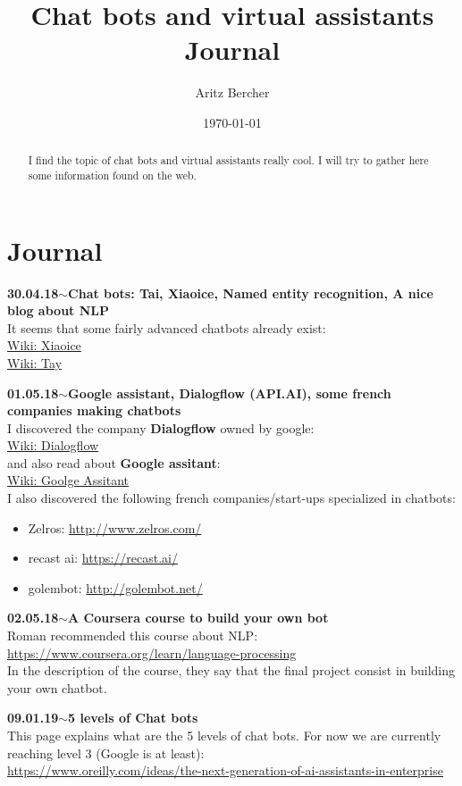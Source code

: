 \documentclass[11pt,a4paper]{article}
\title{Chat bots and virtual assistants\\ Journal}
\author{Aritz Bercher}
\date{\today}
\newenvironment{loggentry}[2]%
{\noindent\textbf{#1}\hspace{1cm}$\mathbf{\sim}$\text{ }\textbf{#2}\\}{\vspace{0.5cm}}
\begin{document}
\maketitle

\begin{abstract}
I find the topic of chat bots and virtual assistants really cool. I will try to gather here some information found on the web.
\end{abstract}

\section{Journal}

\begin{loggentry}{30.04.18}{Chat bots: Tai, Xiaoice, Named entity recognition, A nice blog about NLP}
It seems that some fairly advanced chatbots already exist:\\
\href{https://en.wikipedia.org/wiki/Xiaoice}{Wiki: Xiaoice}\\
\href{https://en.wikipedia.org/wiki/Tay_(bot)}{Wiki: Tay}\\
\end{loggentry}

\begin{loggentry}{01.05.18}{Google assistant, Dialogflow (API.AI), some french companies making chatbots}
I discovered the company \textbf{Dialogflow} owned by google:\\
\href{https://en.wikipedia.org/wiki/Dialogflow}{Wiki: Dialogflow}\\
and also read about \textbf{Google assitant}:\\
\href{https://en.wikipedia.org/wiki/Google_Assistant}{Wiki: Goolge Assitant}\\
I also discovered the following french companies/start-ups specialized in chatbots:\\
\begin{itemize}
\item Zelros: \url{http://www.zelros.com/}
\item recast ai: \url{https://recast.ai/}
\item golembot: \url{http://golembot.net/}
\end{itemize}
\end{loggentry}

\begin{loggentry}{02.05.18}{A Coursera course to build your own bot}
Roman recommended this course about NLP:\\
\url{https://www.coursera.org/learn/language-processing}\\
In the description of the course, they say that the final project consist in building your own chatbot.
\end{loggentry}

\begin{loggentry}{09.01.19}{5 levels of Chat bots}

This page explains what are the 5 levels of chat bots. For now we are currently reaching level 3 (Google is at least):\\
\url{https://www.oreilly.com/ideas/the-next-generation-of-ai-assistants-in-enterprise}\\

\end{loggentry}
\end{document}
